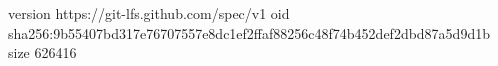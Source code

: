 version https://git-lfs.github.com/spec/v1
oid sha256:9b55407bd317e76707557e8dc1ef2ffaf88256c48f74b452def2dbd87a5d9d1b
size 626416
